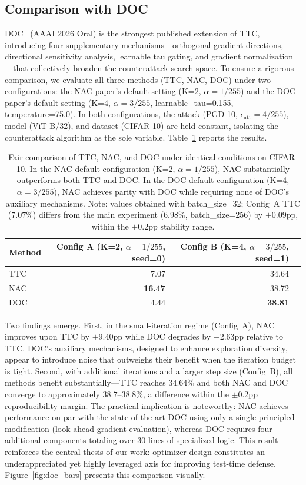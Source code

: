 \documentclass[12pt,a4paper]{article}
\begin{document}
\subsection{Comparison with DOC}

DOC~\cite{jiang2026diversifying} (AAAI 2026 Oral) is the strongest published extension of TTC, introducing four supplementary mechanisms---orthogonal gradient directions, directional sensitivity analysis, learnable tau gating, and gradient normalization---that collectively broaden the counterattack search space. To ensure a rigorous comparison, we evaluate all three methods (TTC, NAC, DOC) under two configurations: the NAC paper's default setting (K=2, $\alpha=1/255$) and the DOC paper's default setting (K=4, $\alpha=3/255$, learnable\_tau=0.155, temperature=75.0). In both configurations, the attack (PGD-10, $\epsilon_{\text{att}}=4/255$), model (ViT-B/32), and dataset (CIFAR-10) are held constant, isolating the counterattack algorithm as the sole variable. Table~\ref{tab:doc} reports the results.

\begin{table}[ht]\centering\small
\caption{Fair comparison of TTC, NAC, and DOC under identical conditions on CIFAR-10. In the NAC default configuration (K=2, $\alpha=1/255$), NAC substantially outperforms both TTC and DOC. In the DOC default configuration (K=4, $\alpha=3/255$), NAC achieves parity with DOC while requiring none of DOC's auxiliary mechanisms. Note: values obtained with batch\_size=32; Config~A TTC ($7.07\%$) differs from the main experiment ($6.98\%$, batch\_size=256) by $+0.09$pp, within the $\pm 0.2$pp stability range.}\label{tab:doc}
\begin{tabular}{@{}lrrr@{}}
\toprule
Method & Config A (K=2, $\alpha{=}1/255$, seed=0) & Config B (K=4, $\alpha{=}3/255$, seed=1) \\
\midrule
TTC & 7.07 & 34.64 \\
NAC & \textbf{16.47} & 38.72 \\
DOC & 4.44 & \textbf{38.81} \\
\bottomrule
\end{tabular}
\end{table}

Two findings emerge. First, in the small-iteration regime (Config~A), NAC improves upon TTC by $+9.40$pp while DOC degrades by $-$2.63pp relative to TTC. DOC's auxiliary mechanisms, designed to enhance exploration diversity, appear to introduce noise that outweighs their benefit when the iteration budget is tight. Second, with additional iterations and a larger step size (Config~B), all methods benefit substantially---TTC reaches $34.64\%$ and both NAC and DOC converge to approximately $38.7$--$38.8\%$, a difference within the $\pm 0.2$pp reproducibility margin. The practical implication is noteworthy: NAC achieves performance on par with the state-of-the-art DOC using only a single principled modification (look-ahead gradient evaluation), whereas DOC requires four additional components totaling over 30 lines of specialized logic. This result reinforces the central thesis of our work: optimizer design constitutes an underappreciated yet highly leveraged axis for improving test-time defense. Figure~\ref{fig:doc_bars} presents this comparison visually.
\end{document}
